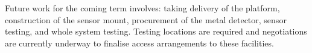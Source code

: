 \documentclass[main.tex]{subfiles}
\begin{document}
Future work for the coming term involves: taking delivery of the platform, construction of the sensor mount, procurement of the metal detector, sensor testing, and whole system testing. 
Testing locations are required and negotiations are currently underway to finalise access arrangements to these facilities. 
\end{document}
